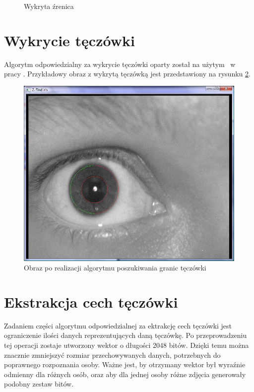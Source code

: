 \begin{itemize}
\begin{figure}
\begin{center}
\caption{Wykryta źrenica}
\label{fig:zrenica2}
\end{center}
\end{figure}


\section{Wykrycie tęczówki}
\label{sec:wykrycieTeczowki}
Algorytm odpowiedzialny za wykrycie tęczówki oparty został na użytym ~w pracy \cite{Gl11}. Przykładowy obraz z wykrytą tęczówką jest przedstawiony na rysunku \ref{fig:teczowkaNasza}.
\begin{figure}
\begin{center}
\includegraphics[scale=0.5]{teczowka.jpg}
\caption{Obraz po realizacji algorytmu poszukiwania granic tęczówki}
\label{fig:teczowkaNasza}
\end{center}
\end{figure}

\section{Ekstrakcja cech tęczówki}
\label{sec:ekstrakcja}
Zadaniem części algorytmu odpowiedzialnej za ektrakcję cech tęczówki jest ograniczenie ilości danych reprezentujących daną tęczówkę. Po przeprowadzeniu tej operacji zostaje utworzony wektor o długości 2048 bitów. Dzięki temu można znacznie zmniejszyć rozmiar przechowywanych danych, potrzebnych do poprawnego rozpoznania osoby. Ważne jest, by otrzymany wektor był wyraźnie odmienny dla różnych osób, oraz aby dla jednej osoby różne zdjęcia generowały podobny zestaw bitów. 


\end{itemize}

